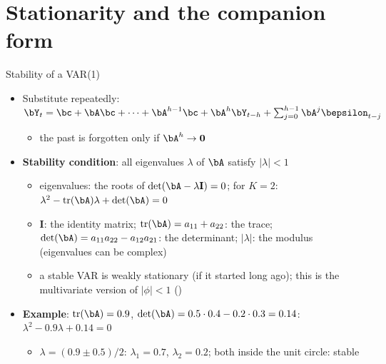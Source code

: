 \section{Stationarity and the companion form}

\begin{frame}{Stability of a VAR(1)}
\itemsize{\small}
\begin{itemize}
    \item Substitute repeatedly: $\bY_t = \bc + \bA\bc + \dots + \bA^{h-1}\bc + \bA^h\bY_{t-h} + \sum_{j=0}^{h-1}\bA^j\bepsilon_{t-j}$
    \begin{itemize}
        \item the past is forgotten only if $\bA^h \to \mathbf{0}$
    \end{itemize}
    \item \textbf{Stability condition}: all eigenvalues $\lambda$ of $\bA$ satisfy $|\lambda| < 1$
    \begin{itemize}
        \item eigenvalues: the roots of $\det(\bA - \lambda\mathbf{I}) = 0$; for $K = 2$: $\lambda^2 - \mathrm{tr}(\bA)\lambda + \det(\bA) = 0$
        \item $\mathbf{I}$: the identity matrix; $\mathrm{tr}(\bA) = a_{11} + a_{22}$: the trace; $\det(\bA) = a_{11}a_{22} - a_{12}a_{21}$: the determinant; $|\lambda|$: the modulus (eigenvalues can be complex)
        \item a stable VAR is weakly stationary (if it started long ago); this is the multivariate version of $|\phi| < 1$ ()
    \end{itemize}
    \item \textbf{Example}: $\mathrm{tr}(\bA) = 0.9$, $\det(\bA) = 0.5 \cdot 0.4 - 0.2 \cdot 0.3 = 0.14$: $\lambda^2 - 0.9\lambda + 0.14 = 0$
    \begin{itemize}
        \item $\lambda = (0.9 \pm 0.5)/2$: $\lambda_1 = 0.7$, $\lambda_2 = 0.2$; both inside the unit circle: stable
    \end{itemize}
\end{itemize}
\end{frame}

